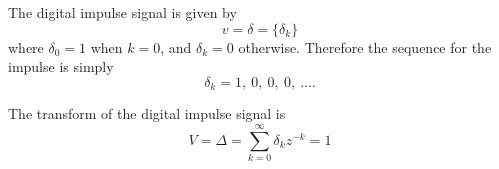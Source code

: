 The digital impulse signal is given by
\begin{equation}\label{eq:l10e3}
  v = \delta = \{\delta_k\}
\end{equation}
where $\delta_0 = 1$ when $k = 0$, and $\delta_k = 0$ otherwise.
Therefore the sequence for the impulse is simply
\[\delta_k = 1,\ 0,\ 0,\ 0,\ \ldots.\]

The transform of the digital impulse signal is
\begin{equation}\label{eq:l10e4}
  V = \Delta = \sum_{k=0}^{\infty}\delta_k z^{-k} = 1
\end{equation}
\endinput
